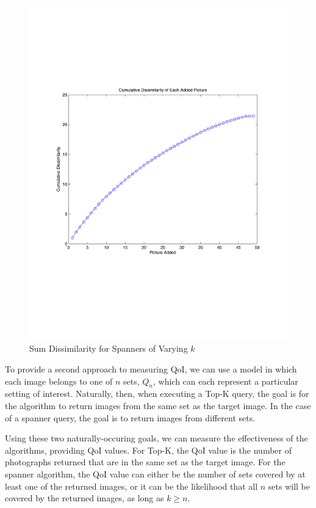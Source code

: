 \begin{figure} 
\begin{centering}
    \includegraphics[scale=0.35]{figures/spannerCumulativeDist.pdf}
    \caption{Sum Dissimilarity for Spanners of Varying $k$}
    \label{fig:spanSumDissim}
\end{centering}
\end{figure}

To provide a second approach to measuring QoI, we can use a model in which each image belongs to one of $n$ sets, $Q_n$, which can each represent a particular setting of interest.  Naturally, then, when executing a Top-K query, the goal is for the algorithm to return images from the same set as the target image.  In the case of a spanner query, the goal is to return images from different sets.  

Using these two naturally-occuring goals, we can measure the effectiveness of the algorithms, providing QoI values.  For Top-K, the QoI value is the number of photographs returned that are in the same set as the target image.  For the spanner algorithm, the QoI value can either be the number of sets covered by at least one of the returned images, or it can be the likelihood that all $n$ sets will be covered by the returned images, as long as $k \geq n$.

